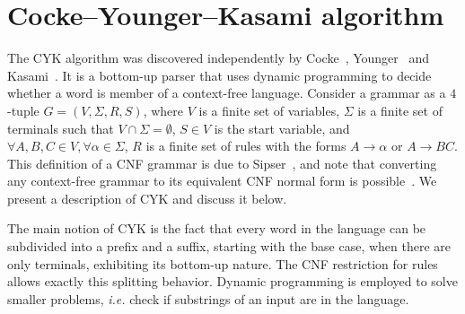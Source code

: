 \documentclass[12pt]{article}
\begin{document}
\section{Cocke–Younger–Kasami algorithm}\label{sec:cyk}

The CYK algorithm was discovered independently by Cocke~\cite{Cocke:book:1970}, Younger~\cite{Younger:article:1967:feb} and Kasami~\cite{Kasami:report:1966:mar}. It is a bottom-up parser that uses dynamic programming to decide whether a word is member of a context-free language. Consider a grammar as a $4$-tuple $G = (V, \Sigma, R, S)$, where $V$ is a finite set of variables, $\Sigma$ is a finite set of terminals such that $V \cap \Sigma = \emptyset$, $S \in V$ is the start variable, and $\forall A, B, C \in V, \forall \alpha \in \Sigma$, $R$ is a finite set of rules with the forms $A \rightarrow \alpha$ or $A \rightarrow BC$. This definition of a CNF grammar is due to Sipser~\cite{Sipser:book:2006}, and note that converting any context-free grammar to its equivalent CNF normal form is possible~\cite[Theorem 2.9]{Sipser:book:2006}. We present a description of CYK and discuss it below.

The main notion of CYK is the fact that every word in the language can be subdivided into a prefix and a suffix, starting with the base case, when there are only terminals, exhibiting its bottom-up nature. The CNF restriction for rules allows exactly this splitting behavior. Dynamic programming is employed to solve smaller problems, \emph{i.e.} check if substrings of an input are in the language.
\end{document}
